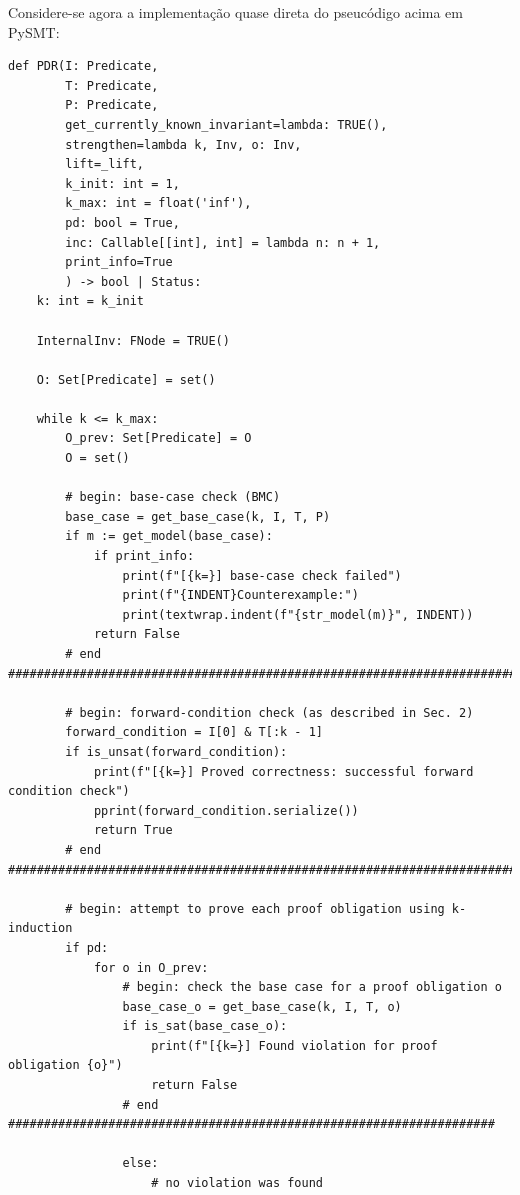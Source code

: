 \documentclass[11pt,a4paper]{report}%
\newenvironment{code}{\captionsetup{type=listing}}{}
\begin{document}
Considere-se agora a implementação quase direta do pseucódigo acima em PySMT:

\begin{code}
\begin{verbatim}
def PDR(I: Predicate,
        T: Predicate,
        P: Predicate,
        get_currently_known_invariant=lambda: TRUE(),
        strengthen=lambda k, Inv, o: Inv,
        lift=_lift,
        k_init: int = 1,
        k_max: int = float('inf'),
        pd: bool = True,
        inc: Callable[[int], int] = lambda n: n + 1,
        print_info=True
        ) -> bool | Status:
    k: int = k_init

    InternalInv: FNode = TRUE()

    O: Set[Predicate] = set()

    while k <= k_max:
        O_prev: Set[Predicate] = O
        O = set()

        # begin: base-case check (BMC)
        base_case = get_base_case(k, I, T, P)
        if m := get_model(base_case):
            if print_info:
                print(f"[{k=}] base-case check failed")
                print(f"{INDENT}Counterexample:")
                print(textwrap.indent(f"{str_model(m)}", INDENT))
            return False
        # end ############################################################################

        # begin: forward-condition check (as described in Sec. 2)
        forward_condition = I[0] & T[:k - 1]
        if is_unsat(forward_condition):
            print(f"[{k=}] Proved correctness: successful forward condition check")
            pprint(forward_condition.serialize())
            return True
        # end ############################################################################

        # begin: attempt to prove each proof obligation using k-induction
        if pd:
            for o in O_prev:
                # begin: check the base case for a proof obligation o
                base_case_o = get_base_case(k, I, T, o)
                if is_sat(base_case_o):
                    print(f"[{k=}] Found violation for proof obligation {o}")
                    return False
                # end ####################################################################

                else:
                    # no violation was found


\end{verbatim}
\end{code}
\end{document}
